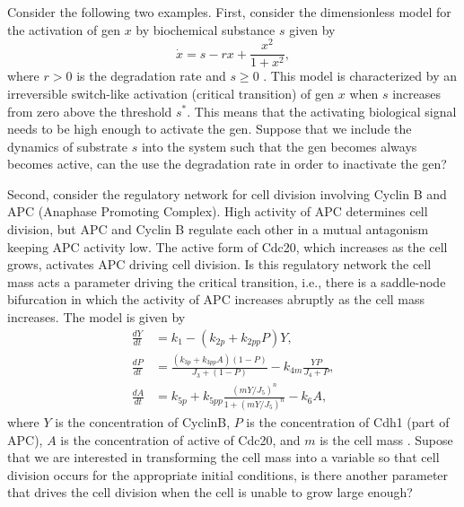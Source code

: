 \documentclass[12pt]{article}
\begin{document}
Consider the following two examples. First, consider the dimensionless model for the activation of gen $x$ by biochemical substance $s$ given by
\begin{equation}
    \dot x = s - rx + \frac{x^{2}}{1+x^{2}},
    \label{equ:Example:GenActivation:1D}
\end{equation}
where $r>0$ is the degradation rate and $s\geq 0$ \citep{Strogatz1994, Lewis1977}. This model is characterized by an irreversible switch-like activation (critical transition) of gen $x$ when $s$ increases from zero above the threshold $s^*$. This means that the activating biological signal needs to be high enough to activate the gen. Suppose that we include the dynamics of substrate $s$ into the system such that the gen becomes always becomes active,
can the use the degradation rate in order to inactivate the gen?

Second, consider the regulatory network for cell division involving Cyclin B and APC (Anaphase Promoting Complex). High activity of APC determines cell division, but APC and Cyclin B regulate each other in a mutual antagonism keeping APC activity low. The active form of Cdc20, which increases as the cell grows, activates APC driving cell division. Is this regulatory network the cell mass acts a parameter driving the critical transition, i.e., there is a saddle-node bifurcation in which the activity of APC increases abruptly as the cell mass increases. The model is given by
\begin{equation}
    \begin{aligned}
        \frac{dY}{dt} &= k_{1} - (k_{2p} + k_{2pp}P)Y, \\
        \frac{dP}{dt} &= \frac{(k_{3p}+k_{3pp}A)(1-P)}{J_{3}+(1-P)} - k_{4m}\frac{YP}{J_{4}+P}, \\
        \frac{dA}{dt} &= k_{5p} + k_{5pp}\frac{(mY/J_{5})^{n}}{1+(mY/J_{5})^{n}} - k_{6}A,
    \end{aligned}
    \label{equ:Example:CyclinActivation:1D}
\end{equation}
where $Y$ is the concentration of CyclinB, $P$ is the concentration of Cdh1 (part of APC), $A$ is the concentration of active of Cdc20, and $m$ is the cell mass \citep{Segel2013,Tyson2001}. Supose that we are interested in transforming the cell mass into a variable so that cell division occurs for the appropriate initial conditions, is there another parameter that drives the cell division when the cell is unable to grow large enough?
\end{document}
